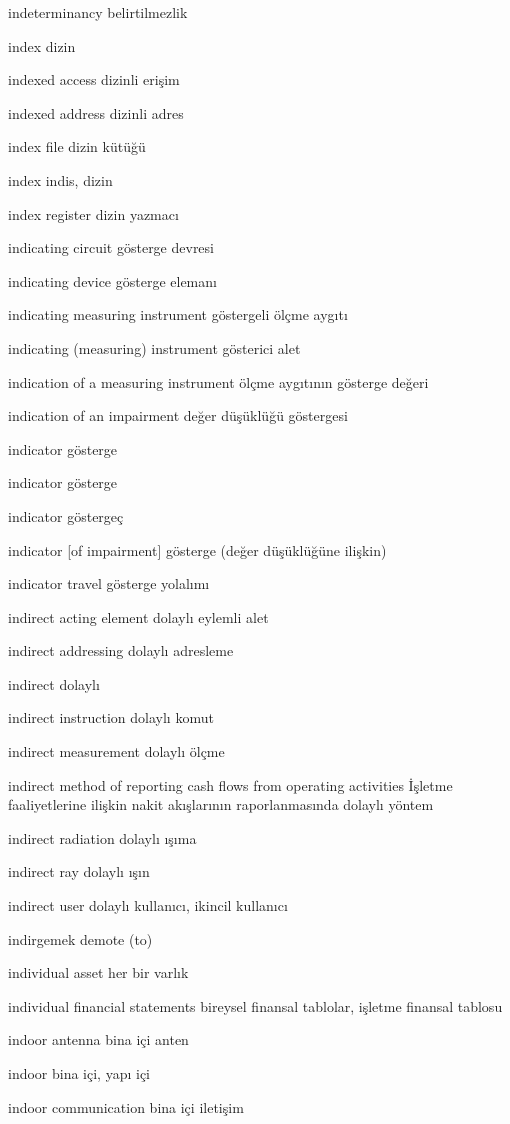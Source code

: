 \documentclass[12pt,fleqn]{article}\usepackage{../../common}
\begin{document}
indeterminancy belirtilmezlik

index dizin

indexed access dizinli erişim

indexed address dizinli adres

index file dizin kütüğü

index indis, dizin

index register dizin yazmacı

indicating circuit gösterge devresi

indicating device gösterge elemanı

indicating measuring instrument göstergeli ölçme aygıtı

indicating (measuring) instrument gösterici alet

indication of a measuring instrument ölçme aygıtının gösterge değeri

indication of an impairment değer düşüklüğü göstergesi

indicator gösterge

indicator gösterge

indicator göstergeç

indicator [of impairment] gösterge (değer düşüklüğüne ilişkin)

indicator travel gösterge yolalımı

indirect acting element dolaylı eylemli alet

indirect addressing dolaylı adresleme

indirect dolaylı

indirect instruction dolaylı komut

indirect measurement dolaylı ölçme

indirect method of reporting cash flows from operating activities İşletme faaliyetlerine ilişkin nakit akışlarının raporlanmasında dolaylı yöntem

indirect radiation dolaylı ışıma

indirect ray dolaylı ışın

indirect user dolaylı kullanıcı, ikincil kullanıcı

indirgemek demote (to)

individual asset her bir varlık

individual financial statements bireysel finansal tablolar, işletme finansal tablosu

indoor antenna bina içi anten

indoor bina içi, yapı içi

indoor communication bina içi iletişim
\end{document}
